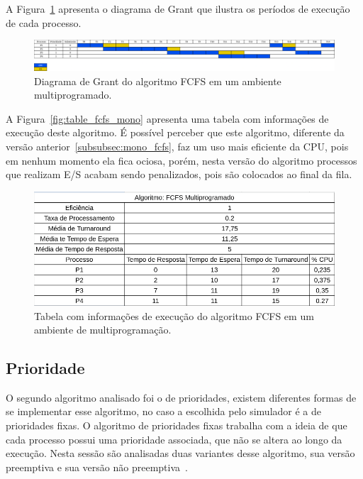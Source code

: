 \documentclass[
	12pt,				%
	oneside,   	        %
	a4paper,			%
	english,			%
	french,				%
	spanish,			%
	brazil,				%
	]{pacotes/abntex2}
\begin{document}
A Figura~\ref{fig:fcfs_multi} apresenta o diagrama de Grant que ilustra os períodos de execução de cada processo.

\begin{figure}[H]
  \centering
  \includegraphics[scale=0.20]{figuras/ex1/fcfs_multi.png}
  \caption{Diagrama de Grant do algoritmo FCFS em um ambiente multiprogramado.}
  \label{fig:fcfs_multi}
\end{figure}

A Figura~\ref{fig:table_fcfs_mono} apresenta uma tabela com informações de execução deste algoritmo. É possível perceber que este algoritmo, diferente da versão anterior~\ref{subsubsec:mono_fcfs}, faz um uso mais eficiente da CPU, pois em nenhum momento ela fica ociosa, porém, nesta versão do algoritmo processos que realizam E/S acabam sendo penalizados, pois são colocados ao final da fila.

\begin{figure}[H]
  \centering
  \includegraphics[scale=0.5]{figuras/ex1/table_fcfs_multi.png}
  \caption{Tabela com informações de execução do algoritmo FCFS em um ambiente de multiprogramação.}
  \label{fig:table_fcfs_multi}
\end{figure}

\subsection{Prioridade}
\label{subsec:prio}

O segundo algoritmo analisado foi o de prioridades, existem diferentes formas de se implementar esse algoritmo, no caso a escolhida pelo simulador é a de prioridades fixas. O algoritmo de prioridades fixas trabalha com a ideia de que cada processo possui uma prioridade associada, que não se altera ao longo da execução. Nesta sessão são analisadas duas variantes desse algoritmo, sua versão preemptiva e sua versão não preemptiva~\cite{maziero2019}.
\end{document}
